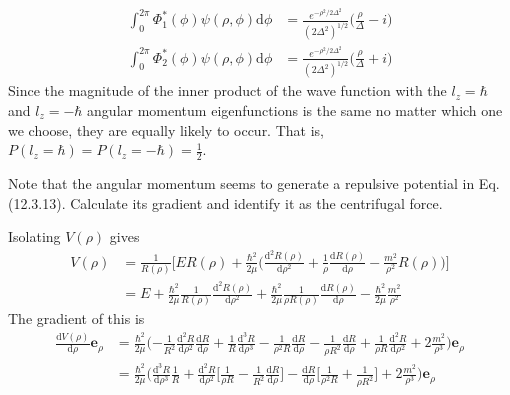 \documentclass[../principles-of-quantum-mechanics.tex]{subfiles}
\begin{document}
\begin{questions}
\begin{solution}
		\begin{align*}
			\int_0^{2\pi}\Phi_1^*(\phi)\psi(\rho, \phi)\mathrm{d}\phi &= \frac{e^{-\rho^2/2\Delta^2}}{(2\Delta^2)^{1/2}}\Big(\frac{\rho}{\Delta} - i\Big) \\
			\int_0^{2\pi}\Phi_2^*(\phi)\psi(\rho,\phi)\mathrm{d}\phi &= \frac{e^{-\rho^2/2\Delta^2}}{(2\Delta^2)^{1/2}}\Big(\frac{\rho}{\Delta} + i\Big)
		\end{align*}
		Since the magnitude of the inner product of the wave function with the $l_z = \hbar$ and $l_z = -\hbar$ angular momentum eigenfunctions is the same no matter which one we choose, they are equally likely to occur. That is, $P(l_z = \hbar) = P(l_z = -\hbar) = \tfrac{1}{2}$.
	\end{solution}
	
	\question Note that the angular momentum seems to generate a repulsive potential in Eq. (12.3.13). Calculate its gradient and identify it as the centrifugal force.
	\begin{solution}
		Isolating $V(\rho)$ gives
		\begin{align*}
			V(\rho) &= \frac{1}{R(\rho)}\Big[ER(\rho) + \frac{\hbar^2}{2\mu}\Big(\frac{\mathrm{d}^2R(\rho)}{\mathrm{d}\rho^2} + \frac{1}{\rho}\frac{\mathrm{d}R(\rho)}{\mathrm{d}\rho} - \frac{m^2}{\rho^2}R(\rho)\Big)\Big] \\
			&= E + \frac{\hbar^2}{2\mu}\frac{1}{R(\rho)}\frac{\mathrm{d}^2R(\rho)}{\mathrm{d}\rho^2} + \frac{\hbar^2}{2\mu}\frac{1}{\rho R(\rho)}\frac{\mathrm{d}R(\rho)}{\mathrm{d}\rho} - \frac{\hbar^2}{2\mu}\frac{m^2}{\rho^2}
		\end{align*}
		The gradient of this is
		\begin{align*}
			\frac{\mathrm{d}V(\rho)}{\mathrm{d}\rho}\mathbf{e}_\rho &= \frac{\hbar^2}{2\mu}\Big({-\frac{1}{R^2}}\frac{\mathrm{d}^2R}{\mathrm{d}\rho^2}\frac{\mathrm{d}R}{\mathrm{d}\rho} + \frac{1}{R}\frac{\mathrm{d}^3R}{\mathrm{d}\rho^3} - \frac{1}{\rho^2R}\frac{\mathrm{d}R}{\mathrm{d}\rho} - \frac{1}{\rho R^2}\frac{\mathrm{d}R}{\mathrm{d}\rho} + \frac{1}{\rho R}\frac{\mathrm{d}^2R}{\mathrm{d}\rho^2} + 2\frac{m^2}{\rho^3}\Big)\mathbf{e}_\rho \\
			&= \frac{\hbar^2}{2\mu}\Big(\frac{\mathrm{d}^3R}{\mathrm{d}\rho^3}\frac{1}{R} + \frac{\mathrm{d}^2R}{\mathrm{d}\rho^2}\Big[\frac{1}{\rho R} - \frac{1}{R^2}\frac{\mathrm{d}R}{\mathrm{d}\rho}\Big] - \frac{\mathrm{d}R}{\mathrm{d}\rho}\Big[\frac{1}{\rho^2 R} + \frac{1}{\rho R^2}\Big] + 2\frac{m^2}{\rho^3}\Big)\mathbf{e}_\rho
		\end{align*}
	\end{solution}
	

\end{questions}
\end{document}
